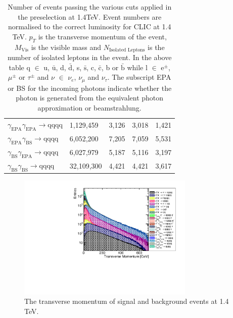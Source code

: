 \begin{table}[h!]
\begin{tabular}{ l l l l l}
$\gamma_{\text{EPA}}\gamma_{\text{EPA}} \rightarrow \text{qqqq}$ & 1,129,459 & 3,126 & 3,018 & 1,421 \\
$\gamma_{\text{EPA}}\gamma_{\text{BS}} \rightarrow \text{qqqq}$ & 6,052,200 & 7,205 & 7,059 & 5,531 \\
$\gamma_{\text{BS}}\gamma_{\text{EPA}} \rightarrow \text{qqqq}$ & 6,027,979 & 5,187 & 5,116 & 3,197 \\
$\gamma_{\text{BS}}\gamma_{\text{BS}} \rightarrow \text{qqqq}$ & 32,109,300 & 4,421 & 4,421 & 3,617 \\
\hline
\end{tabular}
\caption[Number of events passing the various cuts applied in the preselection at 1.4TeV.]{Number of events passing the various cuts applied in the preselection at 1.4TeV.  Event numbers are normalised to the correct luminosity for CLIC at 1.4 TeV.  $p_{T}$ is the transverse momentum of the event,  $M_{\text{Vis}}$ is the visible mass and $N_{\text{Isolated Leptons}}$ is the number of isolated leptons in the event.  In the above table q $\in$ u, $\bar{\text{u}}$, d, $\bar{\text{d}}$, s, $\bar{\text{s}}$, c, $\bar{\text{c}}$, b or $\bar{\text{b}}$ while l $\in$ $\text{e}^{\pm}$, $\mu^{\pm}$ or $\tau^{\pm}$ and $\nu$ $\in$ $\nu_{e}$, $\nu_{\mu}$ and $\nu_{\tau}$.  The subscript EPA or BS for the incoming photons indicate whether the photon is generated from the equivalent photon approximation or beamstrahlung.}
\label{table:preselectionnumbers1400GeV}
\end{table}

\begin{figure}
\centering
\includegraphics[width=0.75\textwidth]{PhysicsAnalysis/Plots/PreSelection/1400GeV/TransverseMomentum.pdf}
\caption[Transverse momentum at 1.4 TeV.]{The transverse momentum of signal and background events at 1.4 TeV.}
\label{fig:preselection1}
\end{figure}

